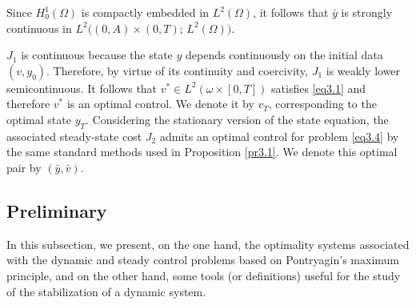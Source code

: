 \documentclass[10pt, a4]{amsart}
\makeatletter
\theoremstyle{plain}
\theoremstyle{definition}
\theoremstyle{remark}
\renewenvironment{proof}[1][\proofname]{\par
  \pushQED{\qed}%
  \normalfont \topsep6\p@\@plus6\p@\relax
  \trivlist
  \item[\hskip\labelsep
        \itshape
    #1\ \ref{#1}.]\ignorespaces
}{%
  \popQED\endtrivlist\@endpefalse
}
\numberwithin{equation}{section}
\makeatother
\begin{document}
\begin{proof}[of Proposition \ref{pr3.1}]
 Since \(H^1_0(\Omega)\) is compactly embedded in \(L^2(\Omega)\), it follows that \(\bar y\) is strongly continuous in $L^2\bigl((0,A)\times(0,T);\,L^2(\Omega)\bigr).$

 \(J_1\) is continuous because the state \(y\) depends continuously on the initial data \((v,y_0)\). Therefore, by virtue of its continuity and coercivity, \(J_1\) is weakly lower semicontinuous. It follows that $v^* \in L^2(\omega \times [0,T])$ satisfies \eqref{eq3.1} and therefore $v^*$ is an optimal control. We denote it by $v_T$, corresponding to the optimal state $y_T$.
\end{proof}
 Considering the stationary version of the state equation, the associated steady‑state cost $J_2$ admits an optimal control for problem \eqref{eq3.4} by the same standard methods used in Proposition \ref{pr3.1}. We denote this optimal pair by $(\bar y,\bar v)$.
\subsection{Preliminary}
In this subsection, we present, on the one hand, the optimality systems associated with the dynamic and steady control problems based on Pontryagin’s maximum principle, and on the other hand, some tools (or definitions) useful for the study of the stabilization of a dynamic system.
\end{document}
